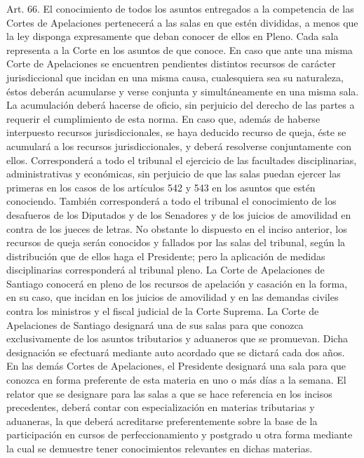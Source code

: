     Art. 66. El conocimiento de todos los asuntos entregados a la competencia de las Cortes de Apelaciones pertenecerá a las salas en que estén divididas, a menos que la ley disponga expresamente que deban conocer de ellos en Pleno.
    Cada sala representa a la Corte en los asuntos de que conoce.
    En caso que ante una misma Corte de Apelaciones se encuentren pendientes distintos recursos de carácter jurisdiccional que incidan en una misma causa, cualesquiera sea su naturaleza, éstos deberán acumularse y verse conjunta y simultáneamente en una misma sala. La acumulación deberá hacerse de oficio, sin perjuicio del derecho de las partes a requerir el cumplimiento de esta norma. En caso que, además de haberse interpuesto recursos jurisdiccionales, se haya deducido recurso de queja, éste se acumulará a los recursos jurisdiccionales, y deberá resolverse conjuntamente con ellos.
    Corresponderá a todo el tribunal el ejercicio de las facultades disciplinarias, administrativas y económicas, sin perjuicio de que las salas puedan ejercer las primeras en los casos de los artículos 542 y 543 en los asuntos que estén conociendo. También corresponderá a todo el tribunal el conocimiento de los desafueros de los Diputados y de los Senadores y de los juicios de amovilidad en contra de los jueces de letras.
    No obstante lo dispuesto en el inciso anterior, los recursos de queja serán conocidos y fallados por las salas del tribunal, según la distribución que de ellos haga el Presidente; pero la aplicación de medidas disciplinarias corresponderá al tribunal pleno.
    La Corte de Apelaciones de Santiago conocerá en pleno de los recursos de apelación y casación en la forma, en su caso, que incidan en los juicios de amovilidad y en las demandas civiles contra los ministros y el fiscal judicial de la Corte Suprema.
    La Corte de Apelaciones de Santiago designará una de sus salas para que conozca exclusivamente de los asuntos tributarios y aduaneros que se promuevan. Dicha designación se efectuará mediante auto acordado que se dictará cada dos años.
    En las demás Cortes de Apelaciones, el Presidente designará una sala para que conozca en forma preferente de esta materia en uno o más días a la semana.
    El relator que se designare para las salas a que se hace referencia en los incisos precedentes, deberá contar con especialización en materias tributarias y aduaneras, la que deberá acreditarse preferentemente sobre la base de la participación en cursos de perfeccionamiento y postgrado u otra forma mediante la cual se demuestre tener conocimientos relevantes en dichas materias.



